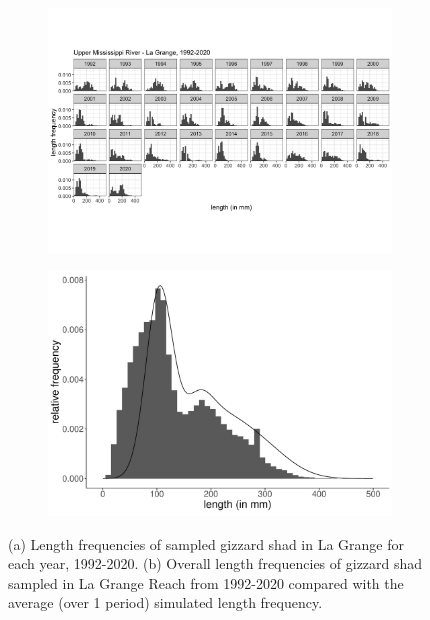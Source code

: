 \documentclass[preprint,review,12pt,authoryear]{elsarticle}
\begin{document}
\begin{figure}
\centering
\begin{subfigure}[b]{.43\textwidth}
  \includegraphics[width=\textwidth]{figures/LTRMlg.png}
   \caption{}
  \label{fig:LTRMlg}
\end{subfigure}
\begin{subfigure}[b]{.43\textwidth}
   \includegraphics[width=\textwidth]{figures/lagrange.pdf}
     \caption{}
\label{fig:lagrange}
\end{subfigure}
\caption{(a) Length frequencies of sampled gizzard shad in La Grange for each year, 1992-2020. (b) Overall length frequencies of gizzard shad sampled in La Grange Reach from 1992-2020 compared with the average (over 1 period) simulated length frequency.}
\end{figure}    
\end{document}
